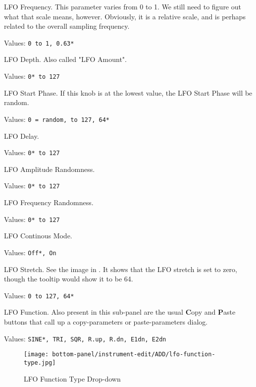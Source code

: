    \setcounter{ItemCounter}{0}      %

   LFO Frequency.
   This parameter varies from 0 to 1.
   We still need to figure out what that scale means, however.
   Obviously, it is a relative scale, and is perhaps related to the
   overall sampling frequency.

   Values: \texttt{0 to 1, 0.63*}

   LFO Depth.  Also called "LFO Amount".

   Values: \texttt{0* to 127}

   LFO Start Phase. If this knob is at the lowest value, the LFO Start
   Phase will be random.

   Values: \texttt{0 = random, to 127, 64*}

   LFO Delay.

   Values: \texttt{0* to 127}

   LFO Amplitude Randomness.

   Values: \texttt{0* to 127}

   LFO Frequency Randomness.

   Values: \texttt{0* to 127}

   LFO Continous Mode.

   Values: \texttt{Off*, On}

   LFO Stretch. See the image in
   .
   It shows that the LFO stretch is set to zero,
   though the tooltip would show it to be 64.

   Values: \texttt{0 to 127, 64*}

   LFO Function.
   Also present in this sub-panel are the usual \textbf{C}opy
   and \textbf{P}aste buttons that call up a copy-parameters or
   paste-parameters dialog.

   Values: \texttt{SINE*, TRI, SQR, R.up, R.dn, E1dn, E2dn}

\begin{figure}[H]
   \centering
   \texttt{[image: bottom-panel/instrument-edit/ADD/lfo-function-type.jpg]}
   \caption[LFO Type Drop-down]{LFO Function Type Drop-down}
   \label{fig:lfo_function_type_dropdown}
\end{figure}

